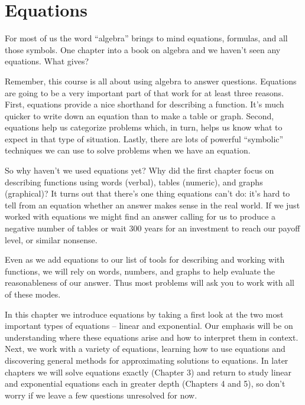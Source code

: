 \chapter{Equations}

For most of us the word ``algebra'' brings to mind equations, formulas, and all those symbols.  One chapter into a book on algebra and we haven't seen any equations.  What gives?   

Remember, this course is all about using algebra to answer questions.  Equations are going to be a very important part of that work for at least three reasons.  First, equations provide a nice shorthand for describing a function.  It's much quicker to write down an equation than to make a table or graph.  Second, equations help us categorize problems which, in turn, helps us know what to expect in that type of situation.  Lastly, there are lots of powerful ``symbolic'' techniques we can use to solve problems when we have an equation.

So why haven't we used equations yet?  Why did the first chapter focus on describing functions using words (verbal), tables (numeric), and graphs (graphical)?  It turns out that there's one thing equations can't do: it's hard to tell from an equation whether an answer makes sense in the real world.  If we just worked with equations we might find an answer calling for us to produce a negative number of tables or wait 300 years for an investment to reach our payoff level, or similar nonsense.  

Even as we add equations to our list of tools for describing and working with functions, we will rely on words, numbers, and graphs to help evaluate the reasonableness of our answer. Thus most problems will ask you to work with all of these modes.

In this chapter we introduce equations by taking a first look at the two most important types of equations -- linear and exponential.  Our emphasis will be on understanding where these equations arise and how to interpret them in context.  Next, we work with a variety of equations, learning how to use equations and discovering general methods for approximating solutions to equations.  In later chapters we will solve equations exactly (Chapter 3) and return to study linear and exponential equations each in greater depth (Chapters 4 and 5), so don't worry if we leave a few questions unresolved for now.
